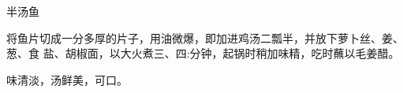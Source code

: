 \begin{recipe}{半汤鱼}

\ingredients


\preparation

将鱼片切成一分多厚的片子，用油微爆，即加进鸡汤二瓢半，并放下萝卜丝、姜、葱、食
盐、胡椒面，以大火煮三、四:分钟，起锅时稍加味精，吃时蘸以毛姜醋。

\features

味清淡，汤鲜美，可口。

\end{recipe}


